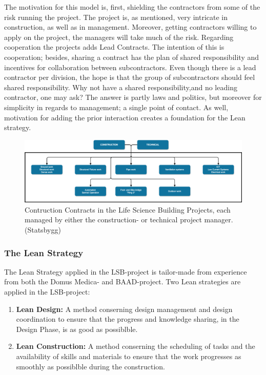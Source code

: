 The motivation for this model is, first, shielding the contractors from some of the risk running the project. The project is, as mentioned, very intricate in construction, as well as in management. Moreover, getting contractors willing to apply on the project, the managers will take much of the risk. Regarding cooperation the projects adds Lead Contracts. The intention of this is cooperation; besides, sharing a contract has the plan of shared responsibility and incentives for collaboration between subcontractors. Even though there is a lead contractor per division, the hope is that the group of subcontractors should feel shared responsibility. Why not have a shared responsibility,and no leading contractor, one may ask? The answer is partly laws and politics, but moreover for simplicity in regards to management; a single point of contact. As well, motivation for adding the prior interaction creates a foundation for the Lean strategy.

\begin{figure}
    \centering
    \includegraphics[width=\textwidth]{fig/LVB_contracts.png}
    \caption{Contruction Contracts in the Life Science Building Projects, each managed by either the construction- or technical project manager. (Statsbygg)}
    \label{fig:project_contracts}
\end{figure}

\subsubsection*{The Lean Strategy}
The Lean Strategy applied in the LSB-project is tailor-made from experience from both the Domus Medica- and BAAD-project. Two Lean strategies are applied in the LSB-project: 

\begin{enumerate}
    \item \textbf{Lean Design:} A method conserning design management and design coordination to ensure that the progress and knowledge sharing, in the Design Phase, is as good as possiblble.
    \item \textbf{Lean Construction:} A method conserning the scheduling
    of tasks and the availability of skills and materials to ensure that the work progresses as smoothly as possiblble during the construction.
\end{enumerate}

